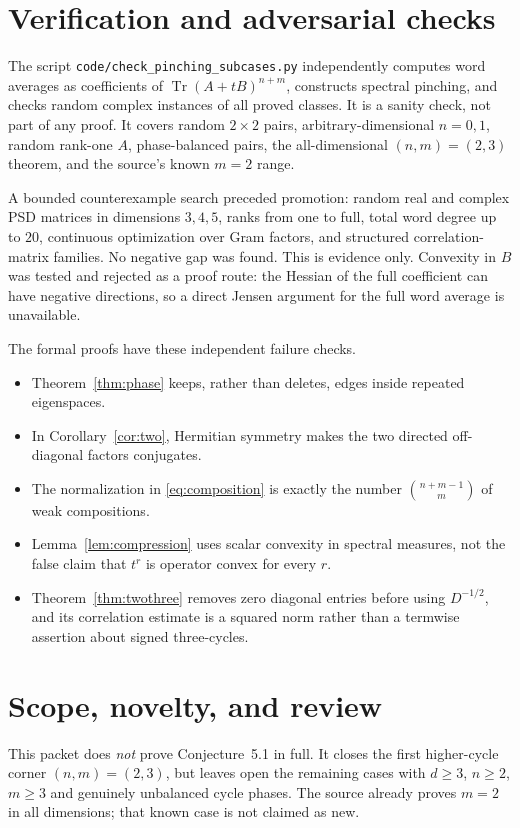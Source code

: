 \documentclass[11pt]{article}
\newcommand{\Tr}{\operatorname{Tr}}
\begin{document}
\section{Verification and adversarial checks}
The script \texttt{code/check\_pinching\_subcases.py} independently computes
word averages as coefficients of \(\Tr(A+tB)^{n+m}\), constructs spectral
pinching, and checks random complex instances of all proved classes. It is a
sanity check, not part of any proof. It covers random \(2\times2\) pairs,
arbitrary-dimensional \(n=0,1\), random rank-one \(A\), phase-balanced
pairs, the all-dimensional \((n,m)=(2,3)\) theorem, and the source's known
\(m=2\) range.

A bounded counterexample search preceded promotion: random real and complex
PSD matrices in dimensions \(3,4,5\), ranks from one to full, total word
degree up to \(20\), continuous optimization over Gram factors, and
structured correlation-matrix families. No negative gap was found. This is
evidence only. Convexity in \(B\) was tested and rejected as a proof route:
the Hessian of the full coefficient can have negative directions, so a
direct Jensen argument for the full word average is unavailable.

The formal proofs have these independent failure checks.
\begin{itemize}
\item Theorem~\ref{thm:phase} keeps, rather than deletes, edges inside
repeated eigenspaces.
\item In Corollary~\ref{cor:two}, Hermitian symmetry makes the two directed
off-diagonal factors conjugates.
\item The normalization in \eqref{eq:composition} is exactly the number
\(\binom{n+m-1}{m}\) of weak compositions.
\item Lemma~\ref{lem:compression} uses scalar convexity in spectral measures,
not the false claim that \(t^r\) is operator convex for every \(r\).
\item Theorem~\ref{thm:twothree} removes zero diagonal entries before using
\(D^{-1/2}\), and its correlation estimate is a squared norm rather than a
termwise assertion about signed three-cycles.
\end{itemize}

\section{Scope, novelty, and review}
This packet does \emph{not} prove Conjecture~5.1 in full. It closes the first
higher-cycle corner \((n,m)=(2,3)\), but leaves open the remaining cases
with \(d\geq3\), \(n\geq2\), \(m\geq3\) and genuinely unbalanced cycle
phases. The source already proves \(m=2\) in all dimensions; that known case
is not claimed as new.
\end{document}
